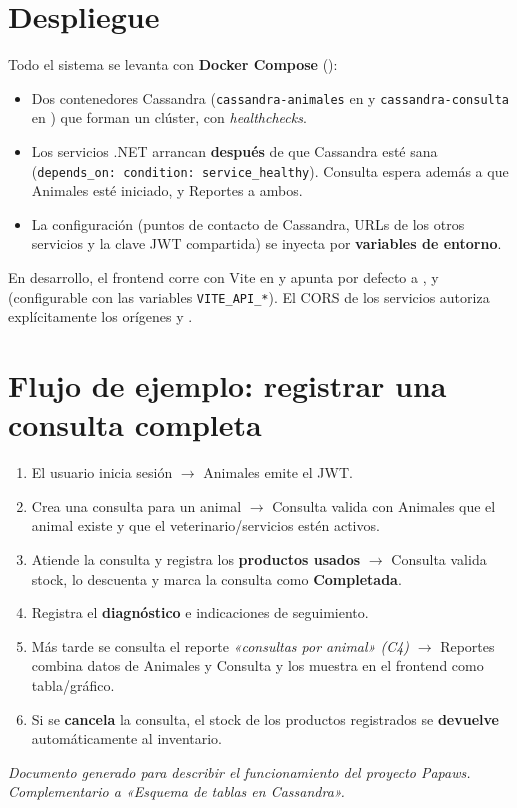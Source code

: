 \documentclass[11pt,a4paper]{article}
\begin{document}
\section{Despliegue}

Todo el sistema se levanta con \textbf{Docker Compose}
():

\begin{itemize}[leftmargin=1.4em]
  \item Dos contenedores Cassandra (\texttt{cassandra-animales} en  y
        \texttt{cassandra-consulta} en ) que forman un clúster, con
        \emph{healthchecks}.
  \item Los servicios .NET arrancan \textbf{después} de que Cassandra esté sana
        (\texttt{depends\_on: condition: service\_healthy}). Consulta espera además a
        que Animales esté iniciado, y Reportes a ambos.
  \item La configuración (puntos de contacto de Cassandra, URLs de los otros
        servicios y la clave JWT compartida) se inyecta por \textbf{variables de
        entorno}.
\end{itemize}

\noindent
En desarrollo, el frontend corre con Vite en  y apunta por defecto a
,  y  (configurable con las variables
\texttt{VITE\_API\_*}). El CORS de los servicios autoriza explícitamente los
orígenes  y .

\section{Flujo de ejemplo: registrar una consulta completa}

\begin{enumerate}[leftmargin=1.6em]
  \item El usuario inicia sesión $\rightarrow$ Animales emite el JWT.
  \item Crea una consulta para un animal $\rightarrow$ Consulta valida con Animales
        que el animal existe y que el veterinario/servicios estén activos.
  \item Atiende la consulta y registra los \textbf{productos usados} $\rightarrow$
        Consulta valida stock, lo descuenta y marca la consulta como
        \textbf{Completada}.
  \item Registra el \textbf{diagnóstico} e indicaciones de seguimiento.
  \item Más tarde se consulta el reporte \emph{«consultas por animal» (C4)}
        $\rightarrow$ Reportes combina datos de Animales y Consulta y los muestra en
        el frontend como tabla/gráfico.
  \item Si se \textbf{cancela} la consulta, el stock de los productos registrados se
        \textbf{devuelve} automáticamente al inventario.
\end{enumerate}

\vspace{1em}
\begin{center}\small\itshape
Documento generado para describir el funcionamiento del proyecto Papaws.\\
Complementario a «Esquema de tablas en Cassandra».
\end{center}
\end{document}
